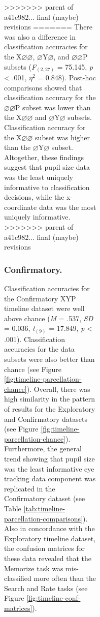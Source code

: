 \documentclass[
  english,
  man, donotrepeattitle,floatsintext]{apa6}
\begin{document}
\begin{figure}
\begin{figure}
\begin{figure}
\begin{figure}
>>>>>>> parent of a41c982... final (maybe) revisions
=======
There was also a difference in classification accuracies for the X\(\varnothing\varnothing\), \(\varnothing\)Y\(\varnothing\), and \(\varnothing\varnothing\)P subsets (\emph{F}\(_{(2, 27)}\) = 75.145, \emph{p} \textless{} .001, \textit{$\eta$}\(^{2}\) = 0.848). Post-hoc comparisons showed that classification accuracy for the \(\varnothing\varnothing\)P subset was lower than the X\(\varnothing\varnothing\) and \(\varnothing\)Y\(\varnothing\) subsets. Classification accuracy for the X\(\varnothing\varnothing\) subset was higher than the \(\varnothing\)Y\(\varnothing\) subset. Altogether, these findings suggest that pupil size data was the least uniquely informative to classification decisions, while the x-coordinate data was the most uniquely informative.
>>>>>>> parent of a41c982... final (maybe) revisions

\subsubsection{Confirmatory.}

Classification accuracies for the Confirmatory XYP timeline dataset were well above chance (\emph{M} = .537, \emph{SD} = 0.036, \emph{t}\(_{(9)}\) = 17.849, \emph{p} \textless{} .001). Classification accuracies for the data subsets were also better than chance (see Figure \ref{fig:timeline-parcellation-chance}). Overall, there was high similarity in the pattern of results for the Exploratory and Confirmatory datasets (see Figure \ref{fig:timeline-parcellation-chance}). Furthermore, the general trend showing that pupil size was the least informative eye tracking data component was replicated in the Confirmatory dataset (see Table \ref{tab:timeline-parcellation-comparisons}). Also in concordance with the Exploratory timeline dataset, the confusion matrices for these data revealed that the Memorize task was mis-classified more often than the Search and Rate tasks (see Figure \ref{fig:timeline-conf-matrices}).


\end{figure}
\end{figure}
\end{figure}
\end{figure}
\end{document}
